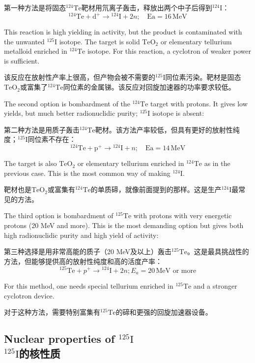 \documentclass[dvipsnames, svgnames,a4paper,11pt]{article}
\begin{document}
第一种方法是将固态\(\mathrm{^{124}Te}\)靶材用氘离子轰击，释放出两个中子后得到\(\mathrm{^{124}I}\)：  
\[
\mathrm{^{124}Te} + \mathrm{d}^+ \rightarrow \mathrm{^{124}I} + 2n; \quad \text{Ea} = 16 \, \text{MeV}
\]  

This reaction is high yielding in activity, but the product is contaminated with the unwanted \(\mathrm{^{125}I}\) isotope. The target is solid \(\mathrm{TeO_2}\) or elementary tellurium metalloid enriched in \(\mathrm{^{124}Te}\) isotope. For this reaction, a cyclotron of weaker power is sufficient.  

该反应在放射性产率上很高，但产物会被不需要的\(\mathrm{^{125}I}\)同位素污染。靶材是固态\(\mathrm{TeO_2}\)或富集了\(\mathrm{^{124}Te}\)同位素的金属锑。该反应对回旋加速器的功率要求较低。  

The second option is bombardment of the \(\mathrm{^{124}Te}\) target with protons. It gives low yields, but much better radionuclidic purity; \(\mathrm{^{125}I}\) isotope is absent:  

第二种方法是用质子轰击\(\mathrm{^{124}Te}\)靶材。该方法产率较低，但具有更好的放射性纯度；\(\mathrm{^{125}I}\)同位素不存在：  
\[
\mathrm{^{124}Te} + \mathrm{p}^+ \rightarrow \mathrm{^{124}I} + n; \quad \text{Ea} = 14 \, \text{MeV}
\]

The target is also \(\mathrm{TeO_2}\) or elementary tellurium enriched in \(\mathrm{^{124}Te}\) as in the previous case. This is the most common way of making \(\mathrm{^{124}I}\).  

靶材也是\(\mathrm{TeO_2}\)或富集有\(\mathrm{^{124}Te}\)的单质碲，就像前面提到的那样。这是生产\(\mathrm{^{124}I}\)最常见的方法。  

The third option is bombardment of \(\mathrm{^{125}Te}\) with protons with very energetic protons (20 MeV and more). This is the most demanding option but gives both high radionuclidic purity and high yield of activity:  

第三种选择是用非常高能的质子（20 MeV及以上）轰击\(\mathrm{^{125}Te}\)。这是最具挑战性的方法，但能够提供高的放射性纯度和高的活度产率：  
\[
\mathrm{^{125}Te} + p^+ \rightarrow \mathrm{^{124}I} + 2n; E_a = 20 \, \text{MeV or more}
\]

For this method, one needs special tellurium enriched in \(\mathrm{^{125}Te}\) and a stronger cyclotron device.

对于这种方法，需要特别富集有\(\mathrm{^{125}Te}\)的碲和更强的回旋加速器设备。

\subsection{Nuclear properties of \(\mathrm{^{125}I}\)\\ \(\mathrm{^{125}I}\)的核性质}
\end{document}
